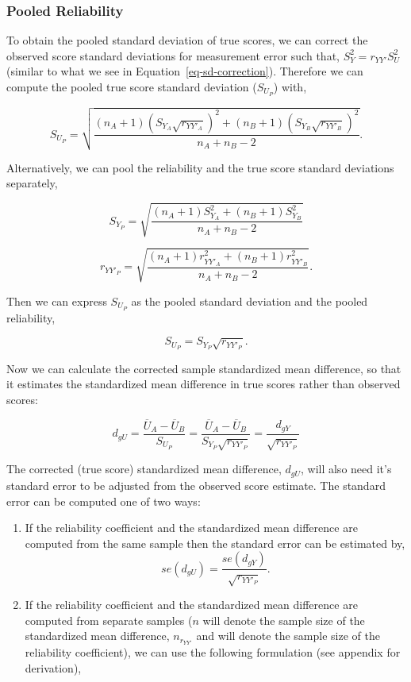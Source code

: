 \documentclass[
  letterpaper,
  DIV=11,
  numbers=noendperiod]{scrreprt}
\providecommand{\tightlist}{%
  \setlength{\itemsep}{0pt}\setlength{\parskip}{0pt}}\usepackage{longtable,booktabs,array}
\begin{document}
\hypertarget{pooled-reliability}{%
\subsubsection*{Pooled Reliability}\label{pooled-reliability}}

To obtain the pooled standard deviation of true scores, we can correct
the observed score standard deviations for measurement error such that,
\(S^2_{Y}=r_{YY'}S^2_{U}\) (similar to what we see in
Equation~\ref{eq-sd-correction}). Therefore we can compute the pooled
true score standard deviation (\(S_{U_P}\)) with,

\[
S_{U_P} = \sqrt{\frac{(n_A+1)\left(S_{Y_A} \sqrt{r_{YY'_A}}\right)^2+(n_B+1)\left(S_{Y_B} \sqrt{r_{YY'_B}}\right)^2}{n_A + n_B - 2}}.
\]

Alternatively, we can pool the reliability and the true score standard
deviations separately,

\[
S_{Y_P} = \sqrt{\frac{(n_A+1)S_{Y_A}^2+(n_B+1)S_{Y_B}^2}{n_A + n_B - 2}}
\]

\[
r_{YY'_P} = \sqrt{\frac{(n_A+1) r_{YY'_A}^2+(n_B+1)r_{YY'_B}^2}{n_A + n_B - 2}}.
\]

Then we can express \(S_{U_P}\) as the pooled standard deviation and the
pooled reliability,

\[
S_{U_P} = S_{Y_P}\sqrt{r_{YY'_P}}.
\]

Now we can calculate the corrected sample standardized mean difference,
so that it estimates the standardized mean difference in true scores
rather than observed scores:

\[
d_{gU} = \frac{\overline{U}_A - \overline{U}_B}{S_{U_P}} =  \frac{\overline{U}_A - \overline{U}_B}{S_{Y_P}\sqrt{r_{YY'_P}}} = \frac{d_{gY}}{\sqrt{r_{YY'_P}}}
\]

The corrected (true score) standardized mean difference, \(d_{gU}\),
will also need it's standard error to be adjusted from the observed
score estimate. The standard error can be computed one of two ways:

\begin{enumerate}
\def\labelenumi{\arabic{enumi}.}
\tightlist
\item
  If the reliability coefficient and the standardized mean difference
  are computed from the same sample then the standard error can be
  estimated by, \[
  se(d_{gU}) = \frac{se(d_{gY})}{\sqrt{r_{YY'_P}}}.
  \]
\item
  If the reliability coefficient and the standardized mean difference
  are computed from separate samples (\(n\) will denote the sample size
  of the standardized mean difference, \(n_{r_{YY'}}\) and will denote
  the sample size of the reliability coefficient), we can use the
  following formulation (see appendix for derivation),
\end{enumerate}
\end{document}
